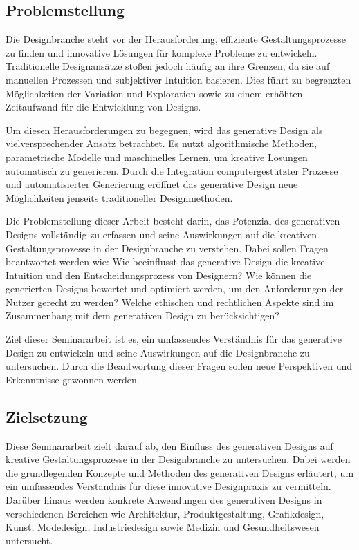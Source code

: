 \subsection*{Problemstellung}

Die Designbranche steht vor der Herausforderung, effiziente Gestaltungsprozesse zu finden und innovative Lösungen für komplexe Probleme zu entwickeln. Traditionelle Designansätze stoßen jedoch häufig an ihre Grenzen, da sie auf manuellen Prozessen und subjektiver Intuition basieren. Dies führt zu begrenzten Möglichkeiten der Variation und Exploration sowie zu einem erhöhten Zeitaufwand für die Entwicklung von Designs.

Um diesen Herausforderungen zu begegnen, wird das generative Design als vielversprechender Ansatz betrachtet. Es nutzt algorithmische Methoden, parametrische Modelle und maschinelles Lernen, um kreative Lösungen automatisch zu generieren. Durch die Integration computergestützter Prozesse und automatisierter Generierung eröffnet das generative Design neue Möglichkeiten jenseits traditioneller Designmethoden.

Die Problemstellung dieser Arbeit besteht darin, das Potenzial des generativen Designs vollständig zu erfassen und seine Auswirkungen auf die kreativen Gestaltungsprozesse in der Designbranche zu verstehen. Dabei sollen Fragen beantwortet werden wie: Wie beeinflusst das generative Design die kreative Intuition und den Entscheidungsprozess von Designern? Wie können die generierten Designs bewertet und optimiert werden, um den Anforderungen der Nutzer gerecht zu werden? Welche ethischen und rechtlichen Aspekte sind im Zusammenhang mit dem generativen Design zu berücksichtigen?

Ziel dieser Seminararbeit ist es, ein umfassendes Verständnis für das generative Design zu entwickeln und seine Auswirkungen auf die Designbranche zu untersuchen. Durch die Beantwortung dieser Fragen sollen neue Perspektiven und Erkenntnisse gewonnen werden.

\subsection*{Zielsetzung}

Diese Seminararbeit zielt darauf ab, den Einfluss des generativen Designs auf kreative Gestaltungsprozesse in der Designbranche zu untersuchen. Dabei werden die grundlegenden Konzepte und Methoden des generativen Designs erläutert, um ein umfassendes Verständnis für diese innovative Designpraxis zu vermitteln. Darüber hinaus werden konkrete Anwendungen des generativen Designs in verschiedenen Bereichen wie Architektur, Produktgestaltung, Grafikdesign, Kunst, Modedesign, Industriedesign sowie Medizin und Gesundheitswesen untersucht.

